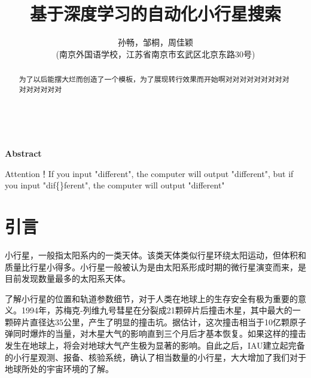 \documentclass[12pt,a4paper]{article}%
\title{\fontsize{18pt}{27pt}\selectfont%
	{\heiti%
    基于深度学习的自动化小行星搜索}}%
\author{\fontsize{12pt}{18pt}\selectfont%
	{\fangsong%
		孙畅，邹桐，周佳颖 }\\%
	\fontsize{10.5pt}{15.75pt}\selectfont%
	{\fangsong%
		(南京外国语学校，江苏省南京市玄武区北京东路30号)}}%
\date{}%
\begin{document}
\maketitle%
\lhead{}%
\chead{}%
\rhead{}%
\lfoot{}%
\cfoot{\thepage}%
\rfoot{}%
\begin{abstract}
    \fangsong 为了以后能摆大烂而创造了一个模板，为了展现转行效果而开始啊对对对对对对对对对对对对对对对
\end{abstract}

\begin{adjustwidth}{1.06cm}{1.06cm}
    \fontsize{10.5pt}{15.75pt}\\
\end{adjustwidth}

\begin{center}%
    {\textbf{Abstract}}%
\end{center}
\begin{adjustwidth}{1.06cm}{1.06cm}%
    \hspace{1.5em}Attention！If you input "dif{}ferent", the computer will output "different", but if you input "dif\{\}ferent", the computer will output "dif{}ferent"
\end{adjustwidth}
\newpage%

\tableofcontents

\newpage

\section{引言}

小行星，一般指太阳系内的一类天体。该类天体类似行星环绕太阳运动，但体积和质量比行星小得多。小行星一般被认为是由太阳系形成时期的微行星演变而来，是目前发现数量最多的太阳系天体。

了解小行星的位置和轨道参数细节，对于人类在地球上的生存安全有极为重要的意义。1994年，苏梅克-列维九号彗星在分裂成21颗碎片后撞击木星，其中最大的一颗碎片直径达35公里，产生了明显的撞击坑。据估计，这次撞击相当于10亿颗原子弹同时爆炸的当量，对木星大气的影响直到三个月后才基本恢复。如果这样的撞击发生在地球上，将会对地球大气产生极为显著的影响。自此之后，IAU建立起完备的小行星观测、报备、核验系统，确认了相当数量的小行星，大大增加了我们对于地球所处的宇宙环境的了解。
\end{document}
